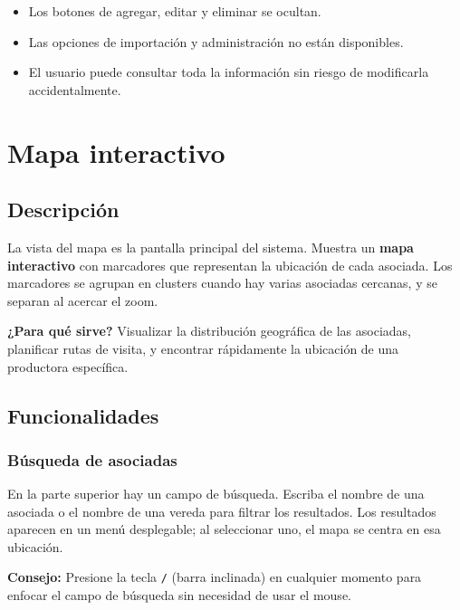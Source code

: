 \documentclass[12pt]{article}
\begin{document}
\begin{itemize}[nosep]
  \item Los botones de agregar, editar y eliminar se ocultan.
  \item Las opciones de importación y administración no están disponibles.
  \item El usuario puede consultar toda la información sin riesgo de modificarla accidentalmente.
\end{itemize}

\section{Mapa interactivo}
\label{sec:mapa}

\subsection{Descripción}
\label{subsec:mapa-descripcion}

La vista del mapa es la pantalla principal del sistema. Muestra un \textbf{mapa interactivo} con marcadores que representan la ubicación de cada asociada. Los marcadores se agrupan en clusters cuando hay varias asociadas cercanas, y se separan al acercar el zoom.

\begin{infobox}
  \textbf{¿Para qué sirve?} Visualizar la distribución geográfica de las asociadas, planificar rutas de visita, y encontrar rápidamente la ubicación de una productora específica.
\end{infobox}

\subsection{Funcionalidades}

\subsubsection{Búsqueda de asociadas}
En la parte superior hay un campo de búsqueda. Escriba el nombre de una asociada o el nombre de una vereda para filtrar los resultados. Los resultados aparecen en un menú desplegable; al seleccionar uno, el mapa se centra en esa ubicación.

\begin{tipbox}
  \textbf{Consejo:} Presione la tecla \texttt{/} (barra inclinada) en cualquier momento para enfocar el campo de búsqueda sin necesidad de usar el mouse.
\end{tipbox}
\end{document}

